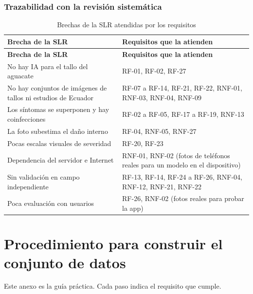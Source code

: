\documentclass[11pt]{article}
\begin{document}
\subsubsection{Trazabilidad con la revisión sistemática}
{\small
\begin{longtable}{|>{\RaggedRight\arraybackslash}p{6.26cm}|>{\RaggedRight\arraybackslash}p{8.6cm}|}
\caption{Brechas de la SLR atendidas por los requisitos}\\
\hline
\rowcolor{encabezado}\textbf{Brecha de la SLR} & \textbf{Requisitos que la atienden} \\ \hline
\endfirsthead
\hline
\rowcolor{encabezado}\textbf{Brecha de la SLR} & \textbf{Requisitos que la atienden} \\ \hline
\endhead
No hay IA para el tallo del aguacate & RF-01, RF-02, RF-27 \\ \hline
No hay conjuntos de imágenes de tallos ni estudios de Ecuador & RF-07 a RF-14, RF-21, RF-22, RNF-01, RNF-03, RNF-04, RNF-09 \\ \hline
Los síntomas se superponen y hay coinfecciones & RF-02 a RF-05, RF-17 a RF-19, RNF-13 \\ \hline
La foto subestima el daño interno & RF-04, RNF-05, RNF-27 \\ \hline
Pocas escalas visuales de severidad & RF-20, RF-23 \\ \hline
Dependencia del servidor e Internet & RNF-01, RNF-02 (fotos de teléfonos reales para un modelo en el dispositivo) \\ \hline
Sin validación en campo independiente & RF-13, RF-14, RF-24 a RF-26, RNF-04, RNF-12, RNF-21, RNF-22 \\ \hline
Poca evaluación con usuarios & RF-26, RNF-02 (fotos reales para probar la app) \\ \hline
\end{longtable}}
\clearpage
\appendix
{}
\section{Procedimiento para construir el conjunto de datos}
Este anexo es la guía práctica. Cada paso indica el requisito que cumple.
\end{document}
